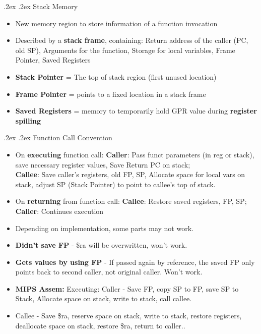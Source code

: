 \documentclass[10pt,landscape,a4paper]{article}
\makeatletter
\renewcommand{\subsection}{\@startsection{subsection}{1}{0mm}%
  {.2ex}%
  {.2ex}%
{\sffamily\bfseries}}
\renewcommand{\subsubsection}{\@startsection{subsubsection}{1}{0mm}%
  {.2ex}%
  {.2ex}%
{\rmfamily\bfseries}}
\makeatother
\begin{document}
\begin{multicols*}{4}
  \subsection{Stack Memory}
  \begin{itemize}
    \item New memory region to store information of a function invocation
    \item Described by a \textbf{stack frame}, containing: Return address of the caller (PC, old SP), Arguments for the function, Storage for local variables, Frame Pointer, Saved Registers
    \item \textbf{Stack Pointer} = The top of stack region (first unused location)
    \item \textbf{Frame Pointer} = points to a fixed location in a stack frame
    \item \textbf{Saved Registers} = memory to temporarily hold GPR value during \textbf{register spilling}
  \end{itemize}
  \subsubsection{Function Call Convention}
  \begin{itemize}
  \item On \textbf{executing} function call: \textbf{Caller}: Pass funct parameters (in reg or stack), save necessary register values, Save Return PC on stack;\\ \textbf{Callee}: Save caller's registers, old FP, SP, Allocate space for local vars on stack, adjust SP (Stack Pointer) to point to callee's top of stack.
  \item On \textbf{returning} from function call: \textbf{Callee}: Restore saved registers, FP, SP;\\ \textbf{Caller}: Continues execution 
  \item Depending on implementation, some parts may not work.
  \item \textbf{Didn't save FP} - \$ra will be overwritten, won't work.
  \item \textbf{Gets values by using FP} - If passed again by reference, the saved FP only points back to second caller, not original caller. Won't work.
  \item \textbf{MIPS Assem:} Executing: Caller - Save FP, copy SP to FP, save SP to Stack, Allocate space on stack, write to stack, call callee.
  \item Callee - Save \$ra, reserve space on stack, write to stack, restore registers, deallocate space on stack, restore \$ra, return to caller..
  \end{itemize}

\end{multicols*}
\end{document}
